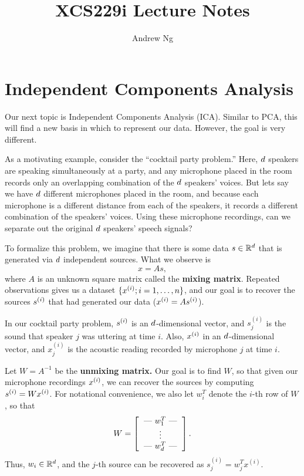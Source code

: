 \documentclass{article}
\begin{document}
\title{XCS229i Lecture Notes}
\author{Andrew Ng}
\date{}
\maketitle




\setcounter{part}{11}
\part{Independent Components Analysis}

Our next topic is Independent Components Analysis (ICA).  Similar to PCA, this
will find a new basis in which to represent our data.  However, the goal is very
different.

As a motivating example, consider the ``cocktail party problem.'' Here, ${d}$
speakers are speaking simultaneously at a party, and any microphone placed in the room
records only an overlapping combination of the ${d}$ speakers' voices.  But lets say we have ${d}$ different microphones
placed in the room, and because each microphone is a different distance from each
of the speakers, it records a different combination of the speakers' voices.  Using
these microphone recordings, can we separate out the original ${d}$ speakers' speech
signals?

To formalize this problem, we imagine that there is some data $s \in {\mathbb R}^{d}$ that is generated via
${d}$ independent sources.  What we observe is
\[
x = As,
\]
where $A$ is an unknown square matrix called the {\bf mixing matrix}.  Repeated observations
gives us a dataset
$\{{x^{(i)}}; i=1, \ldots, {n}\}$, and our goal is to recover the sources ${s^{(i)}}$ that had generated
our data (${x^{(i)}} = A {s^{(i)}}$).

In our cocktail party problem, ${s^{(i)}}$ is an ${d}$-dimensional vector, and $s_j^{(i)}$ is
the sound that speaker $j$ was uttering at time $i$.  Also, ${x^{(i)}}$ in an ${d}$-dimensional vector,
and $x_j^{(i)}$ is the acoustic reading recorded by microphone $j$ at time $i$.

Let $W = A^{-1}$ be the {\bf unmixing matrix.} Our goal is to find $W$, so that given
our microphone recordings ${x^{(i)}}$,
we can recover the sources by computing ${s^{(i)}} = W{x^{(i)}}$.  For notational convenience, we also
let $w_i^T$ denote the $i$-th row of $W$, so that
\[
W = \left[ \begin{tabular}{c} --- $w_1^T$ --- \\ \vdots \\ --- $w_{\di}^T$ --- \end{tabular} \right].
\]
Thus, $w_i \in {\mathbb R}^{d}$, and the $j$-th source can be recovered as $s^{(i)}_j = w_j^T x^{(i)}$.
\end{document}
